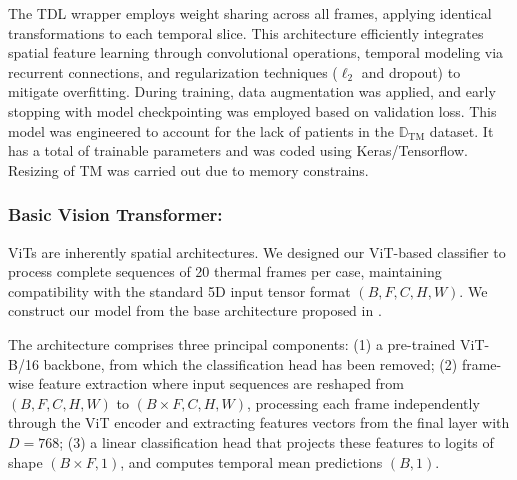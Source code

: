 \documentclass[runningheads]{llncs}
\begin{document}
    

The \ac{TDL} wrapper employs weight sharing across all frames,
applying identical transformations to each temporal slice. This
architecture efficiently integrates spatial feature learning through
convolutional operations, temporal modeling via recurrent connections,
and regularization techniques ($\ell_2$ and dropout) to mitigate
overfitting. During training, data augmentation was applied, and early
stopping with model checkpointing was employed based on validation
loss. This model was engineered to account for the lack of patients in
the $\mathbb{D}_{\mathrm{TM}}$ dataset. It has a total of
 trainable parameters and was coded using
Keras/Tensorflow. Resizing of \ac{TM} was carried out due to memory
constrains.



\subsubsection{Basic Vision Transformer:}
\label{sec:basic-visi-transf}

\ac{ViTs} are inherently spatial architectures. We designed our
\ac{ViT}-based classifier to process complete sequences of 20 thermal
frames per case, maintaining compatibility with the standard 5D input
tensor format $(B, F, C, H, W)$. We construct our model from the base
architecture proposed in \cite{dosovitskiy2020image}.

The architecture comprises three principal components: (1) a
pre-trained ViT-B/16 backbone, from which the classification head has
been removed; (2) frame-wise feature extraction where input sequences
are reshaped from \((B, F, C, H, W)\) to \((B \times F, C, H, W)\),
processing each frame independently through the ViT encoder and
extracting features vectors from the final layer with \(D = 768\);
(3) a linear classification head that projects these features to
logits of shape \((B \times F, 1)\), and computes temporal mean
predictions \((B, 1)\). 
\end{document}
